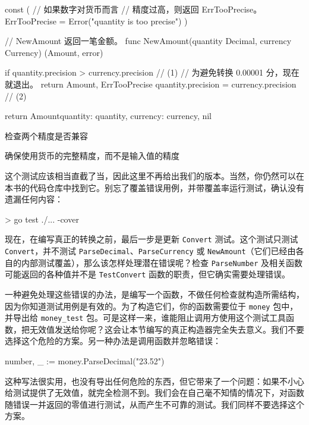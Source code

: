 \begin{gocode}[title={代码清单 6.15 \texttt{amount.go}：\texttt{NewAmount} 函数}]
const (
    // 如果数字对货币而言
    // 精度过高，则返回 ErrTooPrecise。
    ErrTooPrecise = Error("quantity is too precise")
)

// NewAmount 返回一笔金额。
func NewAmount(quantity Decimal, currency Currency) (Amount, error) {
    if quantity.precision > currency.precision { // (1)
        // 为避免转换 0.00001 分，现在就退出。
        return Amount{}, ErrTooPrecise
    }
    quantity.precision = currency.precision // (2)

    return Amount{quantity: quantity, currency: currency}, nil
}
\end{gocode}

\begin{codeannotations}
\item 检查两个精度是否兼容
\item 确保使用货币的完整精度，而不是输入值的精度
\end{codeannotations}

这个测试应该相当直截了当，因此这里不再给出我们的版本。当然，你仍然可以在本书的代码仓库中找到它。别忘了覆盖错误用例，并带覆盖率运行测试，确认没有遗漏任何内容：

\begin{shellcode}[]
> go test ./... -cover
\end{shellcode}

现在，在编写真正的转换之前，最后一步是更新 \texttt{Convert} 测试。这个测试只测试 \texttt{Convert}，并不测试 \texttt{ParseDecimal}、\texttt{ParseCurrency} 或 \texttt{NewAmount}（它们已经由各自的内部测试覆盖），那么该怎样处理潜在错误呢？检查 \texttt{ParseNumber} 及相关函数可能返回的各种值并不是 \texttt{TestConvert} 函数的职责，但它确实需要处理错误。

一种避免处理这些错误的办法，是编写一个函数，不做任何检查就构造所需结构，因为你知道测试用例是有效的。为了构造它们，你的函数需要位于 \texttt{money} 包中，并导出给 \texttt{money\_test} 包。可是这样一来，谁能阻止调用方使用这个测试工具函数，把无效值发送给你呢？这会让本节编写的真正构造器完全失去意义。我们不要选择这个危险的方案。另一种办法是调用函数并忽略错误：

\begin{gocode}[]
number, _ := money.ParseDecimal("23.52")
\end{gocode}

这种写法很实用，也没有导出任何危险的东西，但它带来了一个问题：如果不小心给测试提供了无效值，就完全检测不到。我们会在自己毫不知情的情况下，对函数随错误一并返回的零值进行测试，从而产生不可靠的测试。我们同样不要选择这个方案。

